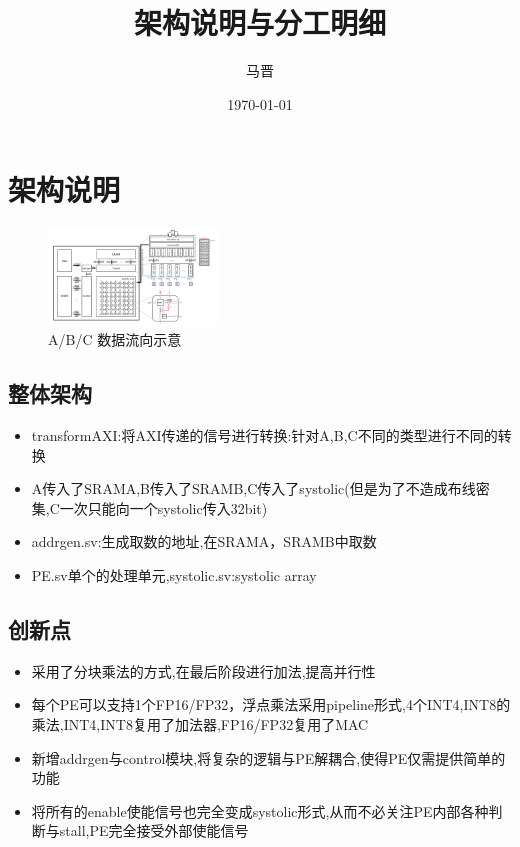\documentclass[zihao=-4, UTF8]{ctexart}
\title{架构说明与分工明细}
\author{马晋}
\date{\today}
\begin{document}
\maketitle
\tableofcontents
\clearpage

\section{架构说明}
\begin{figure}[H]
      \centering
      \includegraphics[width=0.4\textwidth]{架构.png}
      \caption{A/B/C 数据流向示意}
      \label{fig:sram-abc}
    \end{figure}
\subsection{整体架构}
\begin{itemize}
  \item transformAXI:将AXI传递的信号进行转换:针对A,B,C不同的类型进行不同的转换
  \item A传入了SRAMA,B传入了SRAMB,C传入了systolic(但是为了不造成布线密集,C一次只能向一个systolic传入32bit)
  \item addrgen.sv:生成取数的地址,在SRAMA，SRAMB中取数
  \item PE.sv单个的处理单元,systolic.sv:systolic array
\end{itemize}

\subsection{创新点}
\begin{itemize}
  \item 采用了分块乘法的方式,在最后阶段进行加法,提高并行性
  \item 每个PE可以支持1个FP16/FP32，浮点乘法采用pipeline形式,4个INT4,INT8的乘法,INT4,INT8复用了加法器,FP16/FP32复用了MAC
  \item 新增addrgen与control模块,将复杂的逻辑与PE解耦合,使得PE仅需提供简单的功能
  \item 将所有的enable使能信号也完全变成systolic形式,从而不必关注PE内部各种判断与stall,PE完全接受外部使能信号
\end{itemize}
\end{document}

